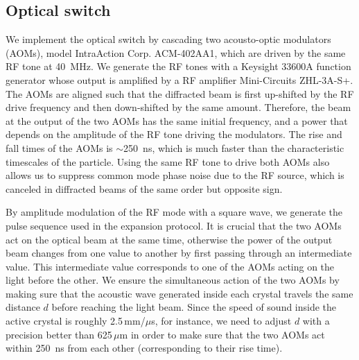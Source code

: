 \documentclass[aps, 
reprint, 
notitlepage,  superscriptaddress, 
onecolumn]{revtex4-1}
\newcommand{\<}{\langle}
\renewcommand{\>}{\rangle}
\begin{document}
\subsection{Optical switch}
\label{sec: optical switch}

We implement the optical switch by cascading two acousto-optic modulators (AOMs), model IntraAction Corp. ACM-402AA1, which are driven by the same RF tone at \SI{40}{MHz}. 
%
We generate the RF tones with a Keysight 33600A function generator whose output is amplified by a  RF amplifier Mini-Circuits ZHL-3A-S+.
%
The AOMs are aligned such that the diffracted beam is first up-shifted by the RF drive frequency and then down-shifted by the same amount.
%
Therefore, the beam at the output of the two AOMs has the same initial frequency, and a power that depends on the amplitude of the RF tone driving the modulators. 
%
The rise and fall times of the AOMs is $\sim$\SI{250}{ns}, which is much faster than the characteristic timescales of the particle.
%
Using the same RF tone to drive both AOMs also allows us to suppress common mode phase noise due to the RF source, which is canceled in diffracted beams of the same order but opposite sign.

By amplitude modulation of the RF mode with a square wave, we generate the pulse sequence used in the expansion protocol. 
%
It is crucial that the two AOMs act on the optical beam at the same time, otherwise the power of the output beam changes from one value to another by first passing through an intermediate value. This intermediate value corresponds to one of the AOMs acting on the light before the other.
%
We ensure the simultaneous action of the two AOMs by making sure that the acoustic wave generated inside each crystal travels the same distance $d$ before reaching the light beam. Since the speed of sound inside the active crystal is roughly 2.5\,mm/$\mu$s, for instance, we need to adjust $d$ with a precision better than 625\,$\mu$m in order to make sure that the two AOMs act within \SI{250}{ns} from each other (corresponding to their rise time). 
\end{document}
